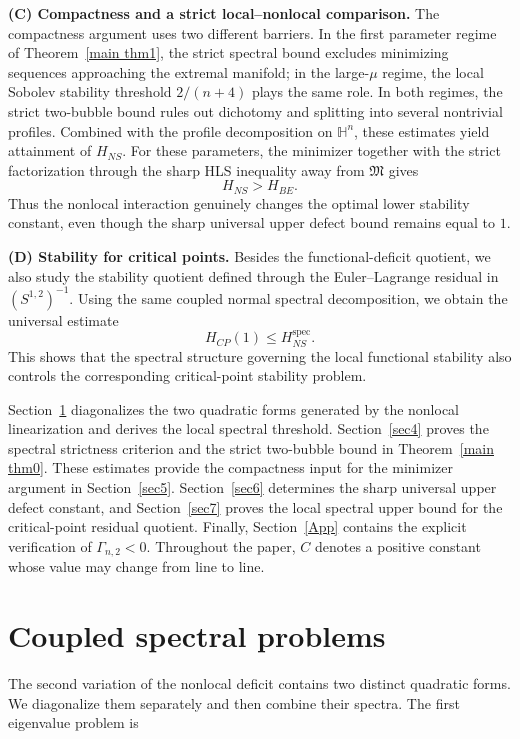 \documentclass[11pt]{article}
\begin{document}
{\bf (C) Compactness and a strict local--nonlocal comparison.}
{The compactness argument uses two different barriers. In the first parameter regime of Theorem~\ref{main thm1}, the strict spectral bound excludes minimizing sequences approaching the extremal manifold; in the large-$\mu$ regime, the local Sobolev stability threshold $2/(n+4)$ plays the same role. In both regimes, the strict two-bubble bound rules out dichotomy and splitting into several nontrivial profiles. Combined with the profile decomposition on $\mathbb H^n$, these estimates yield attainment of $H_{NS}$. For these parameters, the minimizer together with the strict factorization through the sharp HLS inequality away from $\mathfrak M$ gives}
\[
H_{NS}>H_{BE}.
\]
Thus the nonlocal interaction genuinely changes the optimal lower stability constant, even though the sharp universal upper defect bound remains equal to $1$.

\vspace{.1cm}

{\bf (D) Stability for critical points.}
Besides the functional-deficit quotient, we also study the stability quotient defined through the Euler--Lagrange residual in $(S^{1,2})^{-1}$. Using the same coupled normal spectral decomposition, we obtain the universal estimate
\[
H_{CP}(1)\le H_{NS}^{\mathrm{spec}}.
\]
This shows that the spectral structure governing the local functional stability also controls the corresponding critical-point stability problem.


\vspace{.2cm}

\begingroup
Section~\ref{sec3} diagonalizes the two quadratic forms generated by the nonlocal linearization and derives the local spectral threshold. Section~\ref{sec4} proves the spectral strictness criterion and the strict two-bubble bound in Theorem~\ref{main thm0}. These estimates provide the compactness input for the minimizer argument in Section~\ref{sec5}. Section~\ref{sec6} determines the sharp universal upper defect constant, and Section~\ref{sec7} proves the local spectral upper bound for the critical-point residual quotient. Finally, Section~\ref{App} contains the explicit verification of $\Gamma_{n,2}<0$. Throughout the paper, $C$ denotes a positive constant whose value may change from line to line.
\endgroup



\section{Coupled spectral problems}\label{sec3}
{The second variation of the nonlocal deficit contains two distinct quadratic forms. We diagonalize them separately and then combine their spectra. The first eigenvalue problem is}
\end{document}
